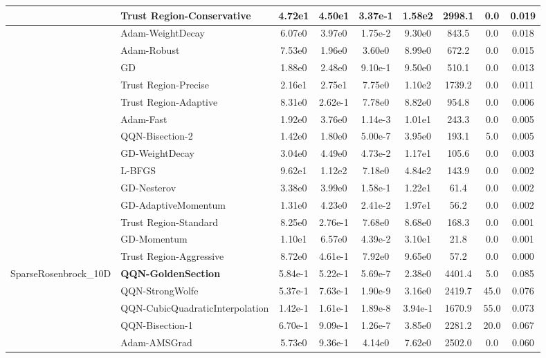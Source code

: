 \documentclass{article}
\begin{document}
\begin{longtable}{|l|l|c|c|c|c|c|c|c|}
\hline
 & Trust Region-Conservative & 4.72e1 & 4.50e1 & 3.37e-1 & 1.58e2 & 2998.1 & 0.0 & 0.019 \\
\hline
 & Adam-WeightDecay & 6.07e0 & 3.97e0 & 1.75e-2 & 9.30e0 & 843.5 & 0.0 & 0.018 \\
\hline
 & Adam-Robust & 7.53e0 & 1.96e0 & 3.60e0 & 8.99e0 & 672.2 & 0.0 & 0.015 \\
\hline
 & GD & 1.88e0 & 2.48e0 & 9.10e-1 & 9.50e0 & 510.1 & 0.0 & 0.013 \\
\hline
 & Trust Region-Precise & 2.16e1 & 2.75e1 & 7.75e0 & 1.10e2 & 1739.2 & 0.0 & 0.011 \\
\hline
 & Trust Region-Adaptive & 8.31e0 & 2.62e-1 & 7.78e0 & 8.82e0 & 954.8 & 0.0 & 0.006 \\
\hline
 & Adam-Fast & 1.92e0 & 3.76e0 & 1.14e-3 & 1.01e1 & 243.3 & 0.0 & 0.005 \\
\hline
 & QQN-Bisection-2 & 1.42e0 & 1.80e0 & 5.00e-7 & 3.95e0 & 193.1 & 5.0 & 0.005 \\
\hline
 & GD-WeightDecay & 3.04e0 & 4.49e0 & 4.73e-2 & 1.17e1 & 105.6 & 0.0 & 0.003 \\
\hline
 & L-BFGS & 9.62e1 & 1.12e2 & 7.18e0 & 4.84e2 & 143.9 & 0.0 & 0.002 \\
\hline
 & GD-Nesterov & 3.38e0 & 3.99e0 & 1.58e-1 & 1.22e1 & 61.4 & 0.0 & 0.002 \\
\hline
 & GD-AdaptiveMomentum & 1.31e0 & 4.23e0 & 2.41e-2 & 1.97e1 & 56.2 & 0.0 & 0.002 \\
\hline
 & Trust Region-Standard & 8.25e0 & 2.76e-1 & 7.68e0 & 8.68e0 & 168.3 & 0.0 & 0.001 \\
\hline
 & GD-Momentum & 1.10e1 & 6.57e0 & 4.39e-2 & 3.10e1 & 21.8 & 0.0 & 0.001 \\
\hline
 & Trust Region-Aggressive & 8.72e0 & 4.61e-1 & 7.92e0 & 9.65e0 & 57.2 & 0.0 & 0.000 \\
SparseRosenbrock\_10D & \textbf{QQN-GoldenSection} & 5.84e-1 & 5.22e-1 & 5.69e-7 & 2.38e0 & 4401.4 & 5.0 & 0.085 \\
\hline
 & QQN-StrongWolfe & 5.37e-1 & 7.63e-1 & 1.90e-9 & 3.16e0 & 2419.7 & 45.0 & 0.076 \\
\hline
 & QQN-CubicQuadraticInterpolation & 1.42e-1 & 1.61e-1 & 1.89e-8 & 3.94e-1 & 1670.9 & 55.0 & 0.073 \\
\hline
 & QQN-Bisection-1 & 6.70e-1 & 9.09e-1 & 1.26e-7 & 3.85e0 & 2281.2 & 20.0 & 0.067 \\
\hline
 & Adam-AMSGrad & 5.73e0 & 9.36e-1 & 4.14e0 & 7.62e0 & 2502.0 & 0.0 & 0.060 \\

\end{longtable}
\end{document}
